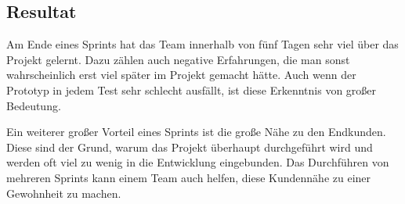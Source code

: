 \subsection*{\label{sec:Sprint-Resultat}\thesubsection\quad Resultat}
Am Ende eines Sprints hat das Team innerhalb von fünf Tagen sehr viel über das Projekt gelernt. Dazu zählen auch negative Erfahrungen, die man sonst wahrscheinlich erst viel später im Projekt gemacht hätte. Auch wenn der Prototyp in jedem Test sehr schlecht ausfällt, ist diese Erkenntnis von großer Bedeutung. 

Ein weiterer großer Vorteil eines Sprints ist die große Nähe zu den Endkunden. Diese sind der Grund, warum das Projekt überhaupt durchgeführt wird und werden oft viel zu wenig in die Entwicklung eingebunden. Das Durchführen von mehreren Sprints kann einem Team auch helfen, diese Kundennähe zu einer Gewohnheit zu machen.
\cite{Sprint}